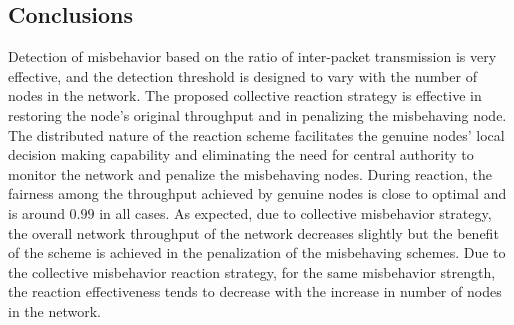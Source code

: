 \documentclass[12pt,letterpaper,english]{article}
\begin{document}
\subsection{Conclusions}
\indent Detection of misbehavior based on the ratio of inter-packet transmission is very effective, and the detection threshold is designed to vary with the number of nodes in the network.
The proposed collective reaction strategy is effective in restoring the node's original throughput and in penalizing the misbehaving node.
The distributed nature of the reaction scheme facilitates the genuine nodes' local decision making capability and eliminating the need for central authority to monitor the network and penalize the misbehaving nodes. 
During reaction, the fairness among the throughput achieved by genuine nodes is close to optimal and is around $0.99$ in all cases. 
As expected, due to collective misbehavior strategy, the overall network throughput of the network decreases slightly but the benefit of the scheme is achieved in the penalization of the misbehaving schemes.
Due to the collective misbehavior reaction strategy, for the same misbehavior strength, the reaction effectiveness tends to decrease with the increase in number of nodes in the network.
\end{document}
